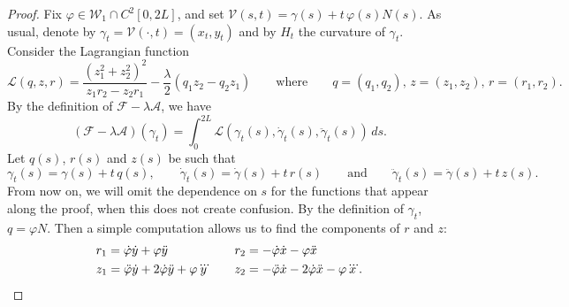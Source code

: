 \documentclass[11pt]{amsart}
\newcommand{\A}{\mathcal A}
\newcommand{\F}{\mathcal F}
\newcommand{\Lag}{\mathscr{L}}
\newcommand{\cW}{\mathcal{W}_1}
\newcommand{\cV}{\mathcal{V}}
\renewcommand{\phi}{\varphi}
\theoremstyle{definition}
\theoremstyle{remark}
\numberwithin{equation}{section}
\begin{document}
\begin{proof}
Fix $\phi \in \cW \cap C^2[0,2L]$, and set $\cV(s,t) = \gamma(s) + t \, \phi(s)N(s)$.
As usual, denote by $\gamma_t = \cV(\cdot,t) = (x_t,y_t)$ and by $H_t$ the curvature of $\gamma_t$. Consider the Lagrangian function
\begin{equation*}
\Lag(q,z,r)= \dfrac{(z_1^2 + z_2^2)^2}{z_1 r_2 - z_2 r_1} - \dfrac{\lambda}{2} (q_1 z_2 - q_2 z_1)
\qquad \text{where} \qquad q = (q_1,q_2), \, z = (z_1, z_2) , \, r = (r_1, r_2) .
\end{equation*}
By the definition of $\F-\lambda\A$, we have
\begin{equation*}
(\mathcal F-\lambda  \A )(\gamma_t) = \int_0^{2L} \Lag(\gamma_t(s), \dot \gamma_t(s) , \ddot \gamma_t(s)) \, ds .
\end{equation*}
Let $q(s)$, $r(s)$ and $z(s)$ be such that
\begin{equation} \label{eq:gamma_t}
\gamma_t(s) = \gamma(s) + t \, q(s),\qquad \dot \gamma_t(s) = \dot \gamma(s) + t \, r(s) \qquad \text{and} \qquad \ddot \gamma_t(s) = \ddot \gamma(s) + t \, z(s) .
\end{equation}
From now on, we will omit the dependence on $s$ for the functions that appear along the proof, when this does not create confusion. By the definition of $\gamma_t$, $q = \phi N$. Then a simple computation allows us to find the components of $r$ and $z$:
\begin{equation} \label{eq:comp_p_dotp}
\begin{split}
& r_1 = \dot \phi \dot y + \phi \ddot y \hspace{1.9cm} r_{2} = - \dot \phi \dot x - \phi \ddot x \\
& z_{1} = \ddot \phi \dot y + 2 \dot \phi \ddot y + \phi \dddot y \qquad z_2 = - \ddot \phi \dot x - 2 \dot \phi \ddot x - \phi \dddot x .

\end{split}
\end{equation}
\end{proof}
\end{document}
